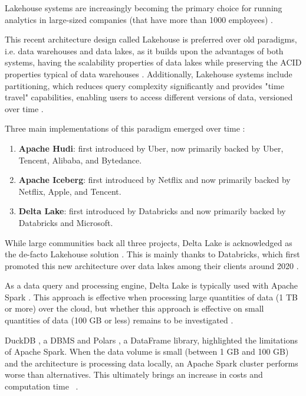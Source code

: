 Lakehouse systems are increasingly becoming the primary choice for running analytics in large-sized companies (that have more than 1000 employees) \cite{StateDataLakehouse2024}. 

This recent architecture design called Lakehouse \cite{lakehouse2021} is preferred over old paradigms, i.e. data warehouses and data lakes, as it builds upon the advantages of both systems, having the scalability properties of data lakes while preserving the \gls{ACID} properties typical of data warehouses \cite{lakehouse2021}. Additionally, Lakehouse systems include partitioning, which reduces query complexity significantly and provides "time travel" capabilities, enabling users to access different versions of data, versioned over time \cite{crociDataLakehouseHype2022}.

Three main implementations of this paradigm emerged over time \cite{ApacheHudiVs}: 
\begin{enumerate}
    \item \textbf{Apache Hudi}: first introduced by Uber, now primarily backed by Uber, Tencent, Alibaba, and Bytedance.
    \item \textbf{Apache Iceberg}: first introduced by Netflix and now primarily backed by Netflix, Apple, and Tencent.
    \item \textbf{Delta Lake}: first introduced by Databricks and now primarily backed by Databricks and Microsoft.
\end{enumerate}

While large communities back all three projects, Delta Lake is acknowledged as the de-facto Lakehouse solution \cite{ApacheHudiVs}. This is mainly thanks to Databricks, which first promoted this new architecture over data lakes among their clients around 2020 \cite{armbrustDeltaLakeHighperformance2020}.

As a data query and processing engine, Delta Lake is typically used with Apache Spark \cite{zahariaApacheSparkUnified2016}. This approach is effective when processing large quantities of data (1 TB or more) over the cloud, but whether this approach is effective on small quantities of data (100 GB or less) remains to be investigated \cite{Khazanchi1801362}.

DuckDB \cite{raasveldtDuckDBEmbeddableAnalytical2019}, a \gls{DBMS} and Polars \cite{vinkWroteOneFastest2021}, a DataFrame library, highlighted the limitations of Apache Spark. When the data volume is small (between 1 GB and 100 GB) and the architecture is processing data locally, an Apache Spark cluster performs worse than alternatives. This ultimately brings an increase in costs and computation time ~\cite{BenchmarkResultsSpark,ebergenUpdatesH2OAi2023}.

